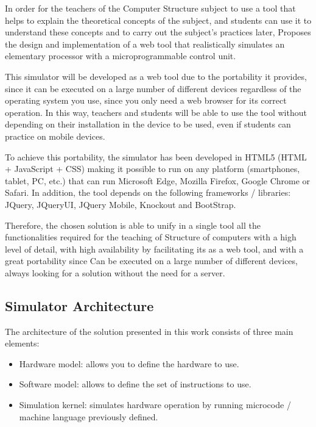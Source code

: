In order for the teachers of the Computer Structure subject to use a tool that helps to explain the theoretical concepts of the subject, and students can use it to understand these concepts and to carry out the subject's practices later, Proposes the design and implementation of a web tool that realistically simulates an elementary processor with a microprogrammable control unit.

This simulator will be developed as a web tool due to the portability it provides, since it can be executed on a large number of different devices regardless of the operating system you use, since you only need a web browser for its correct operation. In this way, teachers and students will be able to use the tool without depending on their installation in the device to be used, even if students can practice on mobile devices.

To achieve this portability, the simulator has been developed in HTML5 (HTML + JavaScript + CSS) making it possible to run on any platform (smartphones, tablet, PC, etc.) that can run Microsoft Edge, Mozilla Firefox, Google Chrome or Safari. In addition, the tool depends on the following frameworks / libraries: JQuery, JQueryUI, JQuery Mobile, Knockout and BootStrap.

Therefore, the chosen solution is able to unify in a single tool all the functionalities required for the teaching of Structure of computers with a high level of detail, with high availability by facilitating its as a web tool, and with a great portability since Can be executed on a large number of different devices, always looking for a solution without the need for a server.

\subsection{Simulator Architecture}

The architecture of the solution presented in this work consists of three main elements:

\begin{itemize}
\item Hardware model: allows you to define the hardware to use.
\item Software model: allows to define the set of instructions to use.
\item Simulation kernel: simulates hardware operation by running microcode / machine language previously defined.
\end{itemize}

